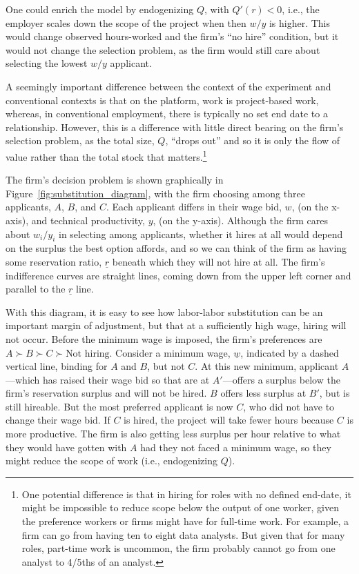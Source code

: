 \documentclass[AER]{AEA}
\begin{document}
One could enrich the model by endogenizing $Q$, with $Q'(r) < 0$, i.e., the employer scales down the scope of the project when then $w/y$ is higher.
This would change observed hours-worked and the firm's ``no hire'' condition, but it would not change the selection problem, as the firm would still care about selecting the lowest $w/y$ applicant. 


A seemingly important difference between the context of the experiment and conventional contexts is that on the platform, work is project-based work, whereas, in conventional employment, there is typically no set end date to a relationship. 
However, this is a difference with little direct bearing on the firm's selection problem, as the total size, $Q$, ``drops out'' and so it is only the flow of value rather than the total stock that matters.\footnote{
  One potential difference is that in hiring for roles with no defined end-date, it might be impossible to reduce scope below the output of one worker, given the preference workers or firms might have for full-time work.
  For example, a firm can go from having ten to eight data analysts.
  But given that for many roles, part-time work is uncommon, the firm
  probably cannot go from one analyst to 4/5ths of an analyst.
}


The firm's decision problem is shown graphically in Figure~\ref{fig:substitution_diagram}, with the firm choosing among three applicants, $A$, $B$, and $C$.
Each applicant differs in their wage bid, $w$, (on the x-axis), and technical productivity, $y$, (on the y-axis).
Although the firm cares about $w_i / y_i$ in selecting among applicants, whether it hires at all would depend on the surplus the best option affords, and so we can think of the firm as having some reservation ratio, $\underline{r}$ beneath which they will not hire at all.
The firm's indifference curves are straight lines, coming down from the upper left corner and parallel to the $\underline{r}$ line.

With this diagram, it is easy to see how labor-labor substitution can be an important margin of adjustment, but that at a sufficiently high wage, hiring will not occur.
Before the minimum wage is imposed, the firm's preferences are $A \succ B \succ C \succ \mbox{Not hiring}$.
Consider a minimum wage, $\underline{w}$, indicated by a dashed vertical line, binding for $A$ and $B$, but not $C$.
At this new minimum, applicant $A$---which has raised their wage bid so that are at $A'$---offers a surplus below the firm's reservation surplus and will not be hired.
$B$ offers less surplus at $B'$, but is still hireable.
But the most preferred applicant is now $C$, who did not have to change their wage bid.
If $C$ is hired, the project will take fewer hours because $C$ is more productive.
The firm is also getting less surplus per hour relative to what they would have gotten with $A$ had they not faced a minimum wage, so they might reduce the scope of work (i.e., endogenizing $Q$). 
\end{document}

